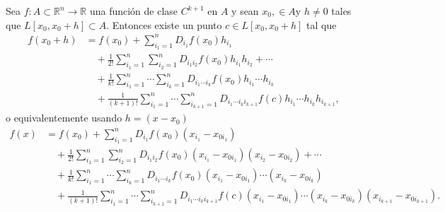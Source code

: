 \begin{teorema}
    Sea $f: A \subset \mathbb{R}^n \to \mathbb{R}$ una función de clase $C^{k+1}$ en $A$ y sean $x_0, \in A$y $h \neq 0$ tales que $L[x_0, x_0 + h] \subset A$. Entonces existe un punto $c \in L[x_0, x_0 + h]$ tal que
    \begin{align*}
    f(x_0 + h) &= f(x_0) + \sum_{i_1=1}^n D_{i_1}f(x_0) h_{i_1} \\
    &\quad + \frac{1}{2!} \sum_{i_1=1}^n \sum_{i_2=1}^n D_{i_1 i_2}f(x_0) h_{i_1} h_{i_2} + \cdots \\
    &\quad + \frac{1}{k!} \sum_{i_1=1}^n \cdots \sum_{i_k=1}^n D_{i_1 \cdots i_k}f(x_0) h_{i_1} \cdots h_{i_k} \\
    &\quad + \frac{1}{(k+1)!} \sum_{i_1=1}^n \cdots \sum_{i_{k+1}=1}^n D_{i_1 \cdots i_k i_{k+1}}f(c) h_{i_1} \cdots h_{i_k} h_{i_{k+1}},
    \end{align*}
    o equivalentemente usando $h = (x - x_0)$
    \begin{align*}
    f(x) &= f(x_0) + \sum_{i_1=1}^n D_{i_1}f(x_0) (x_{i_1} - x_{0 i_1}) \\
    &\quad + \frac{1}{2!} \sum_{i_1=1}^n \sum_{i_2=1}^n D_{i_1 i_2}f(x_0) (x_{i_1} - x_{0 i_1})(x_{i_2} - x_{0 i_2}) + \cdots \\
    &\quad + \frac{1}{k!} \sum_{i_1=1}^n \cdots \sum_{i_k=1}^n D_{i_1 \cdots i_k}f(x_0) (x_{i_1} - x_{0 i_1}) \cdots (x_{i_k} - x_{0 i_k}) \\
    &\quad + \frac{1}{(k+1)!} \sum_{i_1=1}^n \cdots \sum_{i_{k+1}=1}^n D_{i_1 \cdots i_k i_{k+1}}f(c) (x_{i_1} - x_{0 i_1}) \cdots (x_{i_k} - x_{0 i_k})(x_{i_{k+1}} - x_{0 i_{k+1}}).
    \end{align*}    
\end{teorema}
